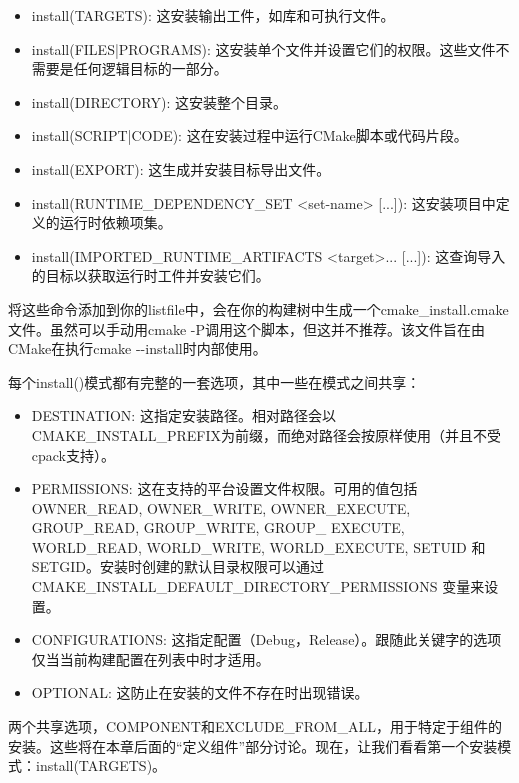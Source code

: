 \begin{itemize}
\item
install(TARGETS): 这安装输出工件，如库和可执行文件。

\item
install(FILES|PROGRAMS): 这安装单个文件并设置它们的权限。这些文件不需要是任何逻辑目标的一部分。

\item
install(DIRECTORY): 这安装整个目录。

\item
install(SCRIPT|CODE): 这在安装过程中运行CMake脚本或代码片段。

\item
install(EXPORT): 这生成并安装目标导出文件。

\item
install(RUNTIME\_DEPENDENCY\_SET <set-name> [...]): 这安装项目中定义的运行时依赖项集。

\item
install(IMPORTED\_RUNTIME\_ARTIFACTS <target>... [...]): 这查询导入的目标以获取运行时工件并安装它们。
\end{itemize}

将这些命令添加到你的listfile中，会在你的构建树中生成一个cmake\_install.cmake文件。虽然可以手动用cmake -P调用这个脚本，但这并不推荐。该文件旨在由CMake在执行cmake -{}-install时内部使用。

每个install()模式都有完整的一套选项，其中一些在模式之间共享：

\begin{itemize}
\item
DESTINATION: 这指定安装路径。相对路径会以CMAKE\_INSTALL\_PREFIX为前缀，而绝对路径会按原样使用（并且不受cpack支持）。

\item
PERMISSIONS: 这在支持的平台设置文件权限。可用的值包括OWNER\_READ, OWNER\_WRITE, OWNER\_EXECUTE, GROUP\_READ, GROUP\_WRITE, GROUP\_ EXECUTE, WORLD\_READ, WORLD\_WRITE, WORLD\_EXECUTE, SETUID 和 SETGID。安装时创建的默认目录权限可以通过 CMAKE\_INSTALL\_DEFAULT\_DIRECTORY\_PERMISSIONS 变量来设置。

\item
CONFIGURATIONS: 这指定配置（Debug，Release）。跟随此关键字的选项仅当当前构建配置在列表中时才适用。

\item
OPTIONAL: 这防止在安装的文件不存在时出现错误。
\end{itemize}

两个共享选项，COMPONENT和EXCLUDE\_FROM\_ALL，用于特定于组件的安装。这些将在本章后面的“定义组件”部分讨论。现在，让我们看看第一个安装模式：install(TARGETS)。

